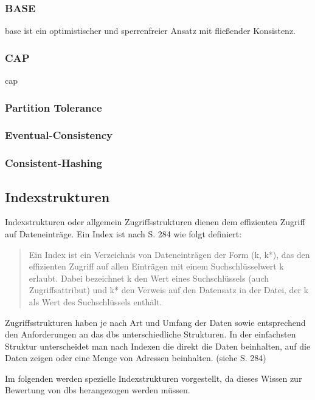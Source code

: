 \subsubsection{BASE}
\Gls{base} ist ein optimistischer und sperrenfreier Ansatz mit fließender Konsistenz.
\cite{book:nosql-einfuehrung}

\subsubsection{CAP}
\Gls{cap}

\subsubsection{Partition Tolerance}

\subsubsection{Eventual-Consistency}

\subsubsection{Consistent-Hashing}



\subsection{Indexstrukturen}

Indexstrukturen oder allgemein Zugriffsstrukturen dienen dem effizienten Zugriff auf Dateneinträge.
Ein Index ist nach \cite{book:kudrass} S. 284 wie folgt definiert:
\begin{quote}
Ein Index ist ein Verzeichnis von Dateneinträgen der Form (k, k*), das den effizienten Zugriff auf allen Einträgen mit einem Suchschlüsselwert k erlaubt. Dabei bezeichnet k den Wert eines Suchschlüssels (auch Zugriffsattribut) und k* den Verweis auf den Datensatz in der Datei, der k als Wert des Suchschlüssels enthält.
\end{quote}
Zugriffsstrukturen haben je nach Art und Umfang der Daten sowie entsprechend den Anforderungen an das \Gls{dbs} unterschiedliche Strukturen.
In der einfachsten Struktur unterscheidet man nach Indexen die direkt die Daten beinhalten, auf die Daten zeigen oder eine Menge von Adressen beinhalten. (siehe \cite{book:kudrass} S. 284)

Im folgenden werden spezielle Indexstrukturen vorgestellt, da dieses Wissen zur Bewertung von \Gls{dbs} herangezogen werden müssen.

